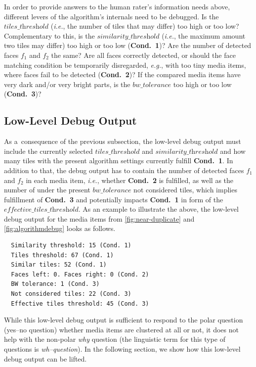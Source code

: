 \documentclass{article}
\begin{document}
In order to provide answers to the human rater's information needs above,
different levers of the algorithm's internals need to be debugged.
Is the $\textit{tiles\_threshold}$
(\emph{i.e.}, the number of tiles that may differ)
too high or too low?
Complementary to this, is the $\textit{similarity\_threshold}$
(\emph{i.e.}, the maximum amount two tiles may differ)
too high or too low (\textbf{Cond.~1})?
Are the number of detected faces $f_1$ and $f_2$ the same?
Are all faces correctly detected,
or should the face matching condition be temporarily disregarded,
\emph{e.g.}, with too tiny media items,
where faces fail to be detected (\textbf{Cond.~2})?
If the compared media items have very dark and/or very bright parts,
is the $\textit{bw\_tolerance}$ too high or too low (\textbf{Cond.~3})?

\subsection{Low-Level Debug Output}
As a~consequence of the previous subsection,
the low-level debug output must include
the currently selected $\textit{tiles\_threshold}$ and
$\textit{similarity\_threshold}$ and how many tiles
with the present algorithm settings currently fulfill \textbf{Cond.~1}.
In addition to that, the debug output has to contain
the number of detected faces $f_1$ and $f_2$
in each media item, \emph{i.e.}, whether \textbf{Cond.~2} is fulfilled,
as well as the number of under the present $\textit{bw\_tolerance}$
not considered tiles, which implies fulfillment of \textbf{Cond.~3}
and potentially impacts \textbf{Cond.~1}
in form of the $\textit{effective\_tiles\_threshold}$.
As an example to illustrate the above,
the low-level debug output for the media items
from \autoref{fig:near-duplicate} and
\autoref{fig:algorithmdebug} looks as follows.

\begin{verbatim}
  Similarity threshold: 15 (Cond. 1)
  Tiles threshold: 67 (Cond. 1)
  Similar tiles: 52 (Cond. 1)
  Faces left: 0. Faces right: 0 (Cond. 2)
  BW tolerance: 1 (Cond. 3)
  Not considered tiles: 22 (Cond. 3)
  Effective tiles threshold: 45 (Cond. 3)
\end{verbatim}

While this low-level debug output is sufficient to respond to the polar question
(yes--no question) whether media items are clustered at all or not,
it does not help with the non-polar \emph{why} question
(the linguistic term for this type of questions is \emph{wh--question}).
In the following section, we show how this low-level debug output can be lifted.
\end{document}
